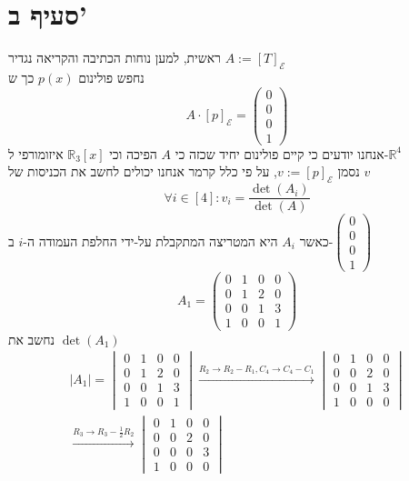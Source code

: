 \documentclass[12pt, titlepage]{article}
\begin{document}
\section*{סעיף ב'}
ראשית, למען נוחות הכתיבה והקריאה נגדיר $A:=\left[T\right]_\mathcal{E}$\\
נחפש פולינום $p\left(x\right)$ כך ש
\[
    A \cdot \left[p\right]_\mathcal{E} = \begin{pmatrix}
        0\\0\\0\\1
    \end{pmatrix}
\]
אנחנו יודעים כי קיים פולינום יחיד שכזה כי $A$ הפיכה וכי $\mathbb{R}_3\left[x\right]$ איזומורפי ל-$\mathbb{R}^4$\\
נסמן $v:=\left[p\right]_\mathcal{E}$, על פי כלל קרמר אנחנו יכולים לחשב את הכניסות של $v$
\[
    \forall i \in \left[4\right]: v_i = \frac{\det\left(A_i\right)}{\det\left(A\right)}
\]
כאשר $A_i$ היא המטריצה המתקבלת על-ידי החלפת העמודה ה-$i$ ב-$\begin{pmatrix} 0\\0\\0\\1\end{pmatrix}$
\[
A_1 = \begin{pmatrix}
        0 & 1 & 0 & 0 \\
        0 & 1 & 2 & 0 \\
        0 & 0 & 1 & 3 \\
        1 & 0 & 0 & 1
    \end{pmatrix} 
\]
נחשב את $\det\left(A_1\right)$
\begin{gather*}
 \left|A_1\right| = \begin{vmatrix}
        0 & 1 & 0 & 0 \\
        0 & 1 & 2 & 0 \\
        0 & 0 & 1 & 3 \\
        1 & 0 & 0 & 1 \end{vmatrix}
        \xrightarrow{R_2\to R_2- R_1, C_4 \to C_4 - C_1}
\begin{vmatrix} 0 & 1 & 0 & 0 \\ 0 & 0 & 2 & 0 \\ 0 & 0 & 1 & 3 \\ 1 & 0 & 0 & 0\end{vmatrix}\\
\xrightarrow{R_3 \to R_3 - \frac{1}{2}R_2} 
\begin{vmatrix} 0 & 1 & 0 & 0 \\ 0 & 0 & 2 & 0 \\ 0 & 0 & 0 & 3 \\ 1 & 0 & 0 & 0\end{vmatrix}\\
\end{gather*}
\end{document}
